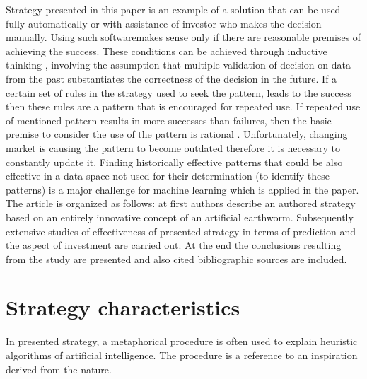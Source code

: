 \documentclass[runningheads,a4paper]{llncs}
\begin{document}
Strategy presented in this paper is an example of a solution that can be used fully automatically or with assistance of investor who makes the decision manually. Using such softwaremakes sense only if there are reasonable premises of achieving the success. These conditions can be achieved through inductive thinking \cite{provost,KleskWilinski}, involving the assumption that multiple validation of decision on data from the past substantiates the correctness of the decision in the future. If a certain set of rules in the strategy used to seek the pattern, leads to the success then these rules are a pattern that is encouraged for repeated use. If repeated use of mentioned pattern results in more successes than failures, then the basic premise to consider the use of the pattern is rational \cite{bishop2006pattern,KleskWilinski}. Unfortunately, changing market is causing the pattern to become outdated therefore it is necessary to constantly update it. Finding historically effective patterns that could be also effective in a data space not used for their determination (to identify these patterns) is a major challenge for machine learning which is applied in the paper.
The article is organized as follows: at first authors describe an authored strategy based on an entirely innovative concept of an artificial earthworm. Subsequently extensive studies of effectiveness of presented strategy in terms of prediction and the aspect of investment are carried out. At the end the conclusions resulting from the study are presented and also cited bibliographic sources are included.

\section{Strategy characteristics}
In presented strategy, a metaphorical procedure is often used to explain heuristic algorithms of artificial intelligence. The procedure is a reference to an inspiration derived from the nature.\\
\end{document}
